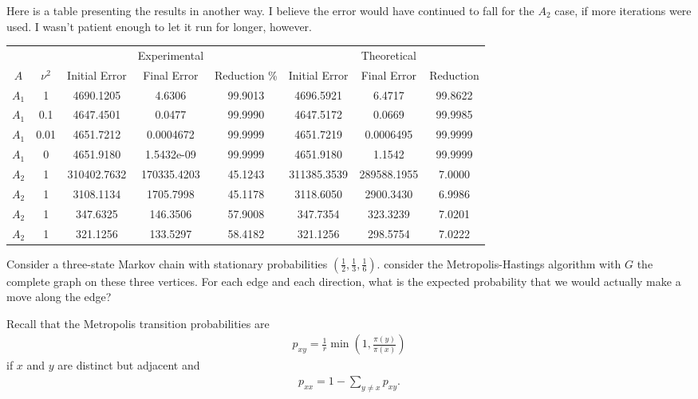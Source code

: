 \begin{homework}[e]
\begin{prf}
    Here is a table presenting the results in another way. I believe the error would have continued to fall for the $A_2$ case, if more iterations were used. I wasn't patient enough to let it run for longer, however.
    \begin{center}  
      \begin{tabular}{cc|ccc|ccc}
        & & & Experimental &&& Theoretical & \\
        $A$ & $\nu^2$ & Initial Error & Final Error & Reduction \% & Initial Error & Final Error & Reduction \\
        \hline
            $A_1$ & 1 & 4690.1205 & 4.6306 & 99.9013 & 4696.5921 & 6.4717 & 99.8622 \\
            $A_1$ & 0.1 & 4647.4501 & 0.0477 & 99.9990 & 4647.5172 & 0.0669 & 99.9985 \\
            $A_1$ & 0.01 & 4651.7212 & 0.0004672 & 99.9999 & 4651.7219 & 0.0006495 & 99.9999 \\
            $A_1$ & 0 & 4651.9180 & 1.5432e-09 & 99.9999 & 4651.9180 & 1.1542 & 99.9999 \\
        \hline
        $A_2$ & 1 & 310402.7632 & 170335.4203 & 45.1243 & 311385.3539 & 289588.1955 & 7.0000 \\
        $A_2$ & 1 & 3108.1134 & 1705.7998 & 45.1178 & 3118.6050 & 2900.3430 & 6.9986 \\
        $A_2$ & 1 & 347.6325 & 146.3506 & 57.9008 & 347.7354 & 323.3239 & 7.0201 \\
        $A_2$ & 1 & 321.1256 & 133.5297 & 58.4182 & 321.1256 & 298.5754 & 7.0222\\
        \hline
      \end{tabular}
    \end{center}
  \end{prf}
  \prob Consider a three-state Markov chain with stationary probabilities $\left(\frac{1}{2}, \frac{1}{3},\frac{1}{6}\right)$. consider the Metropolis-Hastings algorithm with $G$ the complete graph on these three vertices. For each edge and each direction, what is the expected probability that we would actually make a move along the edge?
  \begin{prf}
    Recall that the Metropolis transition probabilities are
    \begin{align*}
      p_{xy} = \frac{1}{r}\min \left(1, \frac{\pi(y)}{\pi(x)}\right) 
    \end{align*}
    if $x$ and $y$ are distinct but adjacent and
    \begin{align*}
      p_{xx} = 1 - \sum_{y\neq x} p_{xy}.

\end{align*}
\end{prf}
\end{homework}
